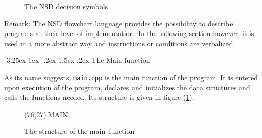 \documentclass[11pt,a4paper,twoside]{report}
\makeatletter
\renewcommand\paragraph{\@startsection{paragraph}{4}{\z@}%
  {-3.25ex\@plus -1ex \@minus -.2ex}%
  {1.5ex \@plus .2ex}%
  {\normalfont\normalsize\bfseries}}
\makeatother
\begin{document}
\begin{figure}[H]
\centering
{}
\caption{The NSD decision symbols }
\end{figure}

Remark: The NSD flowchart language provides the possibility to describe programs at their level of implementation. In the following section however, it is used in a more abstract way and instructions or conditions are verbalized. 
 
\paragraph{The Main function}

As its name suggests, {\tt main.cpp} is the main function of the program. It is entered upon execution of the program, declares and initializes the data structures and calls the functions needed. Its structure is given in figure (\ref{fig:main_structure}).

\begin{figure}[H]
\label{fig:main_structure}
\begin{center}
\begin{struktogramm}(76,27)[MAIN]
\end{struktogramm}
\end{center}

\caption{The structure of the main--function}
\end{figure}
\end{document}
